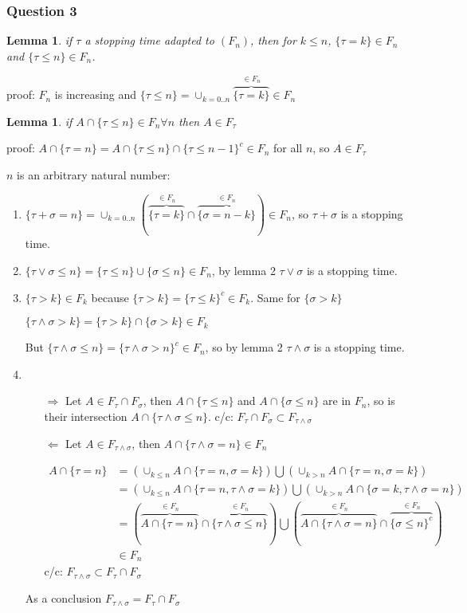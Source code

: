 \documentclass[12pt]{article}
\newcommand{\Q}[1]{\subsubsection*{Question #1}}
\newcommand{\OB}[1]{\overbrace{#1}^{\in F_n}}
\newtheorem{lem}[thm]{Lemma}
\begin{document}
\Q{3}
\begin{lem}
  if $\tau$ a stopping time adapted to $(F_n)$, then for $k \le n$, $\{ \tau = k \} \in F_n$ and $\{ \tau \le n \} \in F_n$.
\end{lem}
proof: $F_n$ is increasing and $\{ \tau \le n \} =  \cup_{k = 0..n} \OB{\{ \tau = k \}} \in F_n$
\begin{lem}
  if $A \cap \{\tau \le n\} \in F_n \forall n$ then $A \in F_{\tau}$
\end{lem}
proof: $A \cap \{\tau = n\} = A \cap \{\tau \le n\} \cap \{\tau \le n-1\}^c \in F_n$ for all $n$, so $A \in F_{\tau}$

$n$ is an arbitrary natural number:
\begin{enumerate}[label=\alph*)] 
\item $\{ \tau + \sigma = n \} = \cup_{k=0..n} (\OB{\{ \tau = k \}} \cap \OB{\{ \sigma = n-k \}}) \in F_n$, so $\tau + \sigma$ is a stopping time.
  \item
  $\{ \tau \vee \sigma \le n\} =
\{ \tau \le n\} \cup \{ \sigma \le n\} \in F_n$,
by lemma 2 $\tau \vee \sigma$ is a stopping time.
\item
  $\{ \tau > k \} \in F_k$ because $\{ \tau > k \} = \{ \tau \le k \}^c \in F_k$. Same for $\{ \sigma > k \}$
  
  $\{ \tau \wedge \sigma > k \} = \{ \tau > k \} \cap \{ \sigma > k \} \in F_k$
  
  But $\{ \tau \wedge \sigma \le n \} =  \{ \tau \wedge \sigma > n  \}^c \in F_n$, 
  so by lemma 2 $\tau \wedge \sigma$ is a stopping time.

\item 
  \begin{itemize}
  \item[$\Rightarrow$]Let $A \in F_{\tau} \cap F_{\sigma}$, then
    $A \cap \{ \tau \le n \}$ and $A \cap \{ \sigma \le n \}$ are in $F_n$,
    so is their intersection $A \cap \{ \tau \wedge \sigma \le n\}$.
    c/c: $F_{\tau} \cap F_{\sigma} \subset F_{\tau \wedge \sigma}$
    \item[$\Leftarrow$] Let $A \in F_{\tau \wedge \sigma}$,
  then $A \cap \{ \tau \wedge \sigma = n \} \in F_n$

  \begin{align*}
    A \cap \{ \tau = n \}
    &= \left(\cup_{k \le n} A \cap \{ \tau = n, \sigma = k \}\right)
      \bigcup \left(\cup_{k > n} A \cap \{ \tau = n, \sigma = k \} \right)
    \\&= \left(\cup_{k \le n} A \cap \{ \tau = n, \tau \wedge \sigma = k \} \right)
        \bigcup \left(\cup_{k > n} A \cap \{ \sigma = k, \tau \wedge \sigma = n \} \right)
    \\&= \left( \OB{A \cap \{ \tau = n \}} \cap \OB{\{\tau \wedge \sigma \le n \}} \right)
        \bigcup \left(\OB{A  \cap \{ \tau \wedge \sigma = n \}} \cap \OB{\{ \sigma \le n \}^c} \right)
    \\& \in F_n
  \end{align*}
  c/c: $ F_{\tau \wedge \sigma} \subset F_{\tau} \cap F_{\sigma}$
  \end{itemize}
As a conclusion $F_{\tau \wedge \sigma} = F_{\tau} \cap F_{\sigma}$
\end{enumerate}
\end{document}
